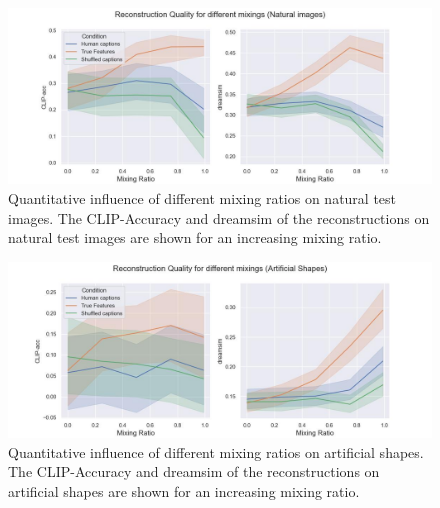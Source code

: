 \begin{figure}[H]
   \centering
   \includegraphics[width=1\textwidth]{plots/aicap_reconstruction_quant_evolution_test.JPEG}
   \caption[Quantitative influence of different mixing ratios on natural test images]{Quantitative influence of different mixing ratios on natural test images. The CLIP-Accuracy and dreamsim of the reconstructions on natural test images are shown for an increasing mixing ratio.}\label{fig:aicap_reconstruction_quant_evolution_test}
\end{figure}

\begin{figure}[H]
   \centering
   \includegraphics[width=1\textwidth]{plots/aicap_reconstruction_quant_evolution_art.JPEG}
   \caption[Quantitative influence of different mixing ratios on artificial shapes]{Quantitative influence of different mixing ratios on artificial shapes. The CLIP-Accuracy and dreamsim of the reconstructions on artificial shapes are shown for an increasing mixing ratio.}\label{fig:aicap_reconstruction_quant_evolution_art}
\end{figure}

